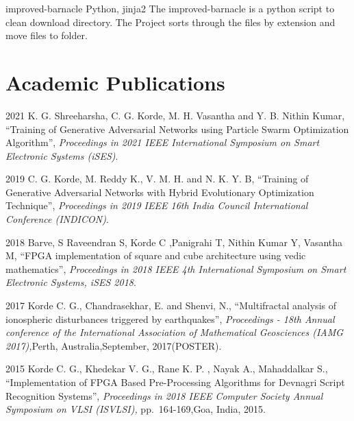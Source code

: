 \documentclass[fontsize=11pt]{tccv}
\begin{document}
\vspace{1em}
\begin{project}
	\item{ improved-barnacle}
	{Python, jinja2}
	{The improved-barnacle is a python script to clean download directory. The Project sorts through the files by extension and move files to folder.}\\
\end{project}	
\vspace{1em}

\section{Academic Publications}

\begin{publi}
\item{2021} {K. G. Shreeharsha, C. G. Korde, M. H. Vasantha and Y. B. Nithin Kumar, \textquotedblleft Training of Generative Adversarial Networks using Particle Swarm Optimization Algorithm\textquotedblright, \textit{Proceedings in 2021 IEEE International Symposium on Smart Electronic Systems (iSES)}.\qquad }
\vspace{1em}

\item{2019} {C. G. Korde, M. Reddy K., V. M. H. and N. K. Y. B, \textquotedblleft Training of Generative Adversarial Networks with Hybrid Evolutionary Optimization Technique\textquotedblright, \textit{Proceedings in 2019 IEEE 16th India Council International Conference (INDICON)}.\qquad }
\item{2018} {Barve, S Raveendran S, Korde C ,Panigrahi T, Nithin Kumar Y, Vasantha M,  \textquotedblleft FPGA implementation of square and cube architecture using vedic mathematics\textquotedblright, \textit{Proceedings in 2018 IEEE 4th International Symposium on Smart Electronic Systems, iSES 2018}.\qquad }
\vspace{1em}

\item{2017} {  Korde C. G., Chandrasekhar, E. and Shenvi, N., \textquotedblleft Multifractal analysis of ionospheric disturbances triggered by earthquakes\textquotedblright, \textit{Proceedings - 18th Annual conference of the International Association of Mathematical Geosciences (IAMG 2017),}Perth, Australia,September, 2017(POSTER).\qquad }
\vspace{1em}

\item{2015} {Korde C. G., Khedekar V. G., Rane K. P. , Nayak A., Mahaddalkar S., \textquotedblleft Implementation of FPGA Based Pre-Processing Algorithms for Devnagri Script Recognition Systems\textquotedblright, \textit{Proceedings in 2018 IEEE Computer Society Annual Symposium on VLSI (ISVLSI),} pp.~164-169,Goa, India, 2015.\qquad }
\end{publi}
\vspace{2em}
\end{document}
